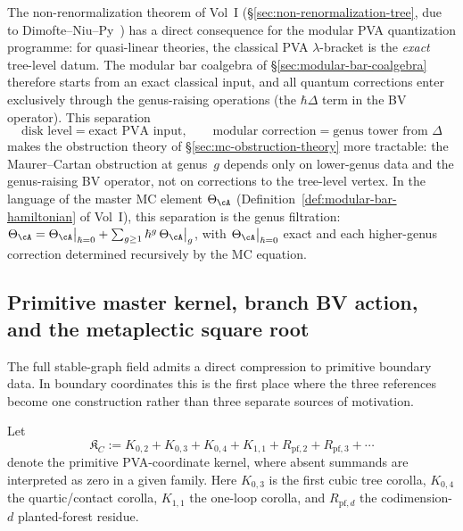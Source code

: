 \begin{remark}
\label{rem:pva-non-renormalization}
The non-renormalization theorem of Vol~I
(\S\ref{sec:non-renormalization-tree}, due to
Dimofte--Niu--Py~\cite{DNP2025}) has a direct consequence for the
modular PVA quantization programme: for quasi-linear theories, the
classical PVA $\lambda$-bracket is the \emph{exact} tree-level datum.
The modular bar coalgebra of
\S\ref{sec:modular-bar-coalgebra} therefore starts from an exact
classical input, and all quantum corrections enter exclusively
through the genus-raising operations (the $\hbar\Delta$ term in the
BV operator).  This separation
\[
  \text{disk level} = \text{exact PVA input},
  \qquad
  \text{modular correction} = \text{genus tower from $\Delta$}
\]
makes the obstruction theory of
\S\ref{sec:mc-obstruction-theory} more tractable:
the Maurer--Cartan obstruction at genus~$g$ depends only on
lower-genus data and the genus-raising BV operator, not on corrections
to the tree-level vertex.  In the language of the master MC element
$\Theta_{\cA}$ (Definition~\ref{def:modular-bar-hamiltonian} of
Vol~I), this separation is the genus filtration:
$\Theta_{\cA} = \Theta_{\cA}\big|_{\hbar=0} +
\sum_{g \geq 1} \hbar^g\,\Theta_{\cA}\big|_{g}$, with
$\Theta_{\cA}\big|_{\hbar=0}$ exact and each higher-genus correction
determined recursively by the MC equation.
\end{remark}



\subsection{Primitive master kernel, branch BV action, and the metaplectic square root}
\label{subsec:vol2-primitive-master-kernel}

The full stable-graph field admits a direct compression to primitive boundary data.
In boundary coordinates this is the first place where the three references become one
construction rather than three separate sources of motivation.

\begin{definition}
\label{def:vol2-primitive-boundary-kernel}
Let
\[
\mathfrak K_C
:=
K_{0,2}+K_{0,3}+K_{0,4}+K_{1,1}+R_{\mathrm{pf},2}+R_{\mathrm{pf},3}+\cdots
\]
denote the primitive PVA-coordinate kernel, where absent summands are interpreted as
zero in a given family.  Here $K_{0,3}$ is the first cubic tree corolla, $K_{0,4}$
the quartic/contact corolla, $K_{1,1}$ the one-loop corolla, and
$R_{\mathrm{pf},d}$ the codimension-$d$ planted-forest residue.
\end{definition}

